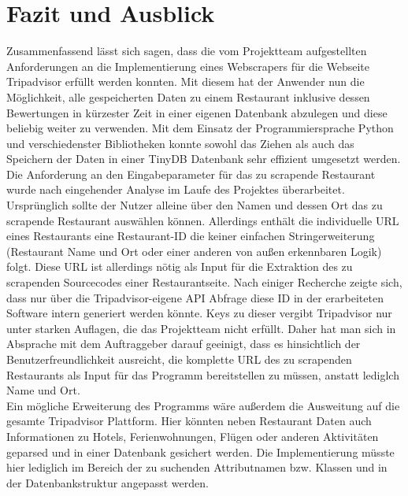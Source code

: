 \documentclass[a4paper,oneside,12pt]{report}
\begin{document}
		
	


	\chapter[Fazit und Ausblick - Anja Wolf]{Fazit und Ausblick}
	
		Zusammenfassend lässt sich sagen, dass die vom Projektteam aufgestellten Anforderungen an die Implementierung eines Webscrapers für die Webseite Tripadvisor erfüllt werden konnten. Mit diesem hat der Anwender nun die Möglichkeit, alle gespeicherten Daten zu einem Restaurant inklusive dessen Bewertungen in kürzester Zeit in einer eigenen Datenbank abzulegen und diese beliebig weiter zu verwenden. Mit dem Einsatz der Programmiersprache Python und verschiedenster Bibliotheken konnte sowohl das Ziehen als auch das Speichern der Daten in einer TinyDB Datenbank sehr effizient umgesetzt werden.  
		\\
		Die Anforderung an den Eingabeparameter für das zu scrapende Restaurant wurde nach eingehender Analyse im Laufe des Projektes  überarbeitet. Ursprünglich sollte der Nutzer alleine über den Namen und dessen Ort das zu scrapende Restaurant auswählen können. Allerdings enthält die individuelle URL eines Restaurants eine Restaurant-ID die keiner einfachen Stringerweiterung (Restaurant Name und Ort oder einer anderen von außen erkennbaren Logik) folgt. Diese URL ist allerdings nötig als Input für die Extraktion des zu scrapenden Sourcecodes einer Restaurantseite. Nach einiger Recherche zeigte sich, dass nur über die Tripadvisor-eigene API Abfrage diese ID in der erarbeiteten Software intern generiert werden könnte. Keys zu dieser vergibt Tripadvisor nur unter starken Auflagen, die das Projektteam nicht erfüllt. Daher hat man sich in Absprache mit dem Auftraggeber darauf geeinigt, dass es hinsichtlich der Benutzerfreundlichkeit ausreicht, die komplette URL des zu scrapenden Restaurants als Input für das Programm bereitstellen zu müssen, anstatt lediglch Name und Ort. 
		\\
		Ein mögliche Erweiterung des Programms wäre außerdem die Ausweitung auf die gesamte Tripadvisor Plattform. Hier könnten neben Restaurant Daten auch Informationen zu Hotels, Ferienwohnungen, Flügen oder anderen Aktivitäten geparsed und in einer Datenbank gesichert werden. Die Implementierung müsste hier lediglich im Bereich der zu suchenden Attributnamen bzw. Klassen und in der Datenbankstruktur angepasst werden.
		
	
	
\end{document}
